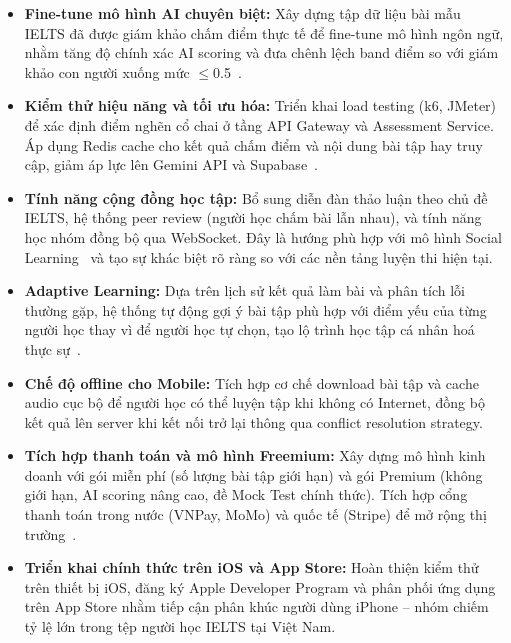 \documentclass[a4paper,12pt]{extreport}
\begin{document}
\begin{itemize}
    \item \textbf{Fine-tune mô hình AI chuyên biệt:} Xây dựng tập dữ liệu bài mẫu IELTS đã được giám khảo chấm điểm thực tế để fine-tune mô hình ngôn ngữ, nhằm tăng độ chính xác AI scoring và đưa chênh lệch band điểm so với giám khảo con người xuống mức $\leq$0.5~\cite{le2023nlp}.

    \item \textbf{Kiểm thử hiệu năng và tối ưu hóa:} Triển khai load testing (k6, JMeter) để xác định điểm nghẽn cổ chai ở tầng API Gateway và Assessment Service. Áp dụng Redis cache cho kết quả chấm điểm và nội dung bài tập hay truy cập, giảm áp lực lên Gemini API và Supabase~\cite{postgresql-docs}.

    \item \textbf{Tính năng cộng đồng học tập:} Bổ sung diễn đàn thảo luận theo chủ đề IELTS, hệ thống peer review (người học chấm bài lẫn nhau), và tính năng học nhóm đồng bộ qua WebSocket. Đây là hướng phù hợp với mô hình Social Learning~\cite{vygotsky1978mind} và tạo sự khác biệt rõ ràng so với các nền tảng luyện thi hiện tại.

    \item \textbf{Adaptive Learning:} Dựa trên lịch sử kết quả làm bài và phân tích lỗi thường gặp, hệ thống tự động gợi ý bài tập phù hợp với điểm yếu của từng người học thay vì để người học tự chọn, tạo lộ trình học tập cá nhân hoá thực sự~\cite{tran2022elearning}.

    \item \textbf{Chế độ offline cho Mobile:} Tích hợp cơ chế download bài tập và cache audio cục bộ để người học có thể luyện tập khi không có Internet, đồng bộ kết quả lên server khi kết nối trở lại thông qua conflict resolution strategy.

    \item \textbf{Tích hợp thanh toán và mô hình Freemium:} Xây dựng mô hình kinh doanh với gói miễn phí (số lượng bài tập giới hạn) và gói Premium (không giới hạn, AI scoring nâng cao, đề Mock Test chính thức). Tích hợp cổng thanh toán trong nước (VNPay, MoMo) và quốc tế (Stripe) để mở rộng thị trường~\cite{statista-elearning}.

    \item \textbf{Triển khai chính thức trên iOS và App Store:} Hoàn thiện kiểm thử trên thiết bị iOS, đăng ký Apple Developer Program và phân phối ứng dụng trên App Store nhằm tiếp cận phân khúc người dùng iPhone -- nhóm chiếm tỷ lệ lớn trong tệp người học IELTS tại Việt Nam.
\end{itemize}
\end{document}
